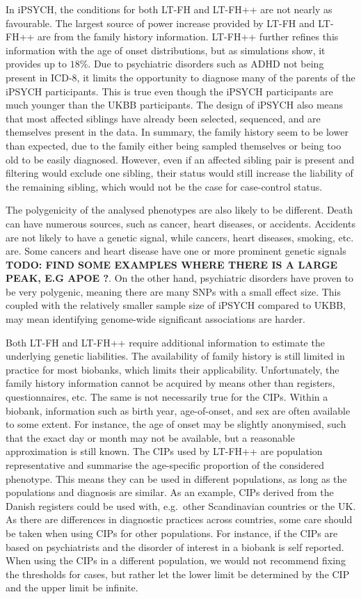 In iPSYCH, the conditions for both LT-FH and LT-FH++ are not nearly as favourable. The largest source of power increase provided by LT-FH and LT-FH++ are from the family history information. LT-FH++ further refines this information with the age of onset distributions, but as simulations show, it provides up to $ 18\% $. Due to psychiatric disorders such as ADHD not being present in ICD-8, it limits the opportunity to diagnose many of the parents of the iPSYCH participants. This is true even though the iPSYCH participants are much younger than the UKBB participants. The design of iPSYCH also means that most affected siblings have already been selected, sequenced, and are themselves present in the data. In summary, the family history seem to be lower than expected, due to the family either being sampled themselves or being too old to be easily diagnosed. However, even if an affected sibling pair is present and filtering would exclude one sibling, their status would still increase the liability of the remaining sibling, which would not be the case for case-control status.

The polygenicity of the analysed phenotypes are also likely to be different. Death can have numerous sources, such as cancer, heart diseases, or accidents. Accidents are not likely to have a genetic signal, while cancers, heart diseases, smoking, etc. are. Some cancers and heart disease have one or more prominent genetic signals \textbf{TODO: FIND SOME EXAMPLES WHERE THERE IS A LARGE PEAK, E.G APOE ?}. On the other hand, psychiatric disorders have proven to be very polygenic, meaning there are many SNPs with a small effect size. This coupled with the relatively smaller sample size of iPSYCH compared to UKBB, may mean identifying genome-wide significant associations are harder.

Both LT-FH and LT-FH++ require additional information to estimate the underlying genetic liabilities. The availability of family history is still limited in practice for most biobanks, which limits their applicability. Unfortunately, the family history information cannot be acquired by means other than registers, questionnaires, etc. The same is not necessarily true for the CIPs. Within a biobank, information such as birth year, age-of-onset, and sex are often available to some extent. For instance, the age of onset may be slightly anonymised, such that the exact day or month may not be available, but a reasonable approximation is still known. The CIPs used by LT-FH++ are population representative and summarise the age-specific proportion of the considered phenotype. This means they can be used in different populations, as long as the populations and diagnosis are similar. As an example, CIPs derived from the Danish registers could be used with, e.g.\ other Scandinavian countries or the UK. As there are differences in diagnostic practices across countries, some care should be taken when using CIPs for other populations. For instance, if the CIPs are based on psychiatrists and the disorder of interest in a biobank is self reported. When using the CIPs in a different population, we would not recommend fixing the thresholds for cases, but rather let the lower limit be determined by the CIP and the upper limit be infinite. 
